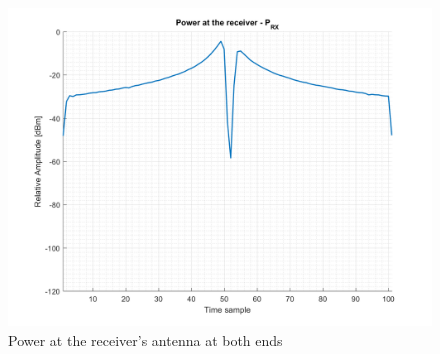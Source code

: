 \begin{figure}[H]
	\centering
	\includegraphics[scale=0.75]{figures/s3_power.png}
	\caption{Power at the receiver's antenna at both ends}
	\label{fig:s3_power}
\end{figure}